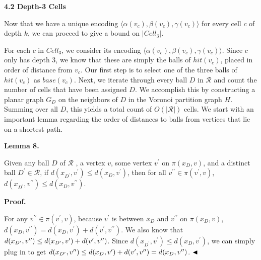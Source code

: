 \documentclass[10pt,a4paper]{article}
\begin{document}
\par
\par
\par\medskip\noindent\textbf{4.2 Depth-3 Cells}\par
Now that we have a unique encoding $\langle\alpha(v_{c}),\beta(v_{c}),\gamma(v_{c})\rangle$ for every cell $c$ of depth $k$, we can proceed to give a bound on $|\mathit{Cell}_{3}|$.
\par
\par
For each $c$ in $\mathit{Cell}_{3}$, we consider its encoding $\langle\alpha(v_{c}),\beta(v_{c}),\gamma(v_{c})\rangle$. Since $c$ only has depth 3, we know that these are simply the balls of $\mathit{hit}(v_{c})$, placed in order of distance from $v_{c}$. Our first step is to select one of the three balls of $\mathit{hit}(v_{c})$ as $\mathit{base}(v_{c})$. Next, we iterate through every ball $D$ in $\mathcal{R}$ and count the number of cells that have been assigned $D$. We accomplish this by constructing a planar graph $G_{D}$ on the neighbors of $D$ in the Voronoi partition graph $H$. Summing over all $D$, this yields a total count of $O(|\mathcal{R}|)$ cells. We start with an important lemma regarding the order of distances to balls from vertices that lie on a shortest path.
\par
\par
\par\medskip\noindent\textbf{Lemma 8.}\par
Given any ball $D$ of $\mathcal{R}$ , a vertex $v$, some vertex $v^{\prime}$ on $\pi(x_{D},v)$, and a distinct ball $D^{\prime}\in\mathcal{R}$, if $d(x_{D^{\prime}},v^{\prime})\leq d(x_{D},v^{\prime})$, then for all $v^{\prime\prime}\in\pi(v^{\prime},v)$, $d(x_{D^{\prime}},v^{\prime\prime})\leq d(x_{D},v^{\prime\prime})$.
\par
\par
\par
\par\medskip\noindent\textbf{Proof.}\par
For any $v^{\prime\prime}\in\pi(v^{\prime},v)$, because $v^{\prime}$ is between $x_{D}$ and $v^{\prime\prime}$ on $\pi(x_{D},v)$, $d(x_{D},v^{\prime\prime})=d(x_{D},v^{\prime})+d(v^{\prime},v^{\prime\prime})$. We also know that $d(x_{D^{\prime}},v^{\prime\prime})\leq d(x_{D^{\prime}},v^{\prime})+d(v^{%
\prime},v^{\prime\prime})$. Since $d(x_{D^{\prime}},v^{\prime})\leq d(x_{D},v^{\prime})$, we can simply plug in to get $d(x_{D^{\prime}},v^{\prime\prime})\leq d(x_{D},v^{\prime})+d(v^{\prime},v^{%
\prime\prime})=d(x_{D},v^{\prime\prime})$. $\hfill\blacktriangleleft$
\end{document}
